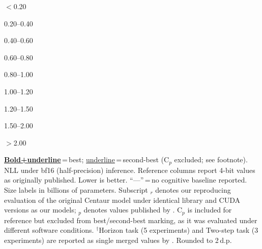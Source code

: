 \begin{table}
\begin{minipage}{\ctrtblwd}
\vspace{4pt}
\begin{center}\footnotesize
\colorbox{c1!45}{\strut\hspace{5pt}} \scriptsize$<$0.20 \quad
\colorbox{c2!40}{\strut\hspace{5pt}} \scriptsize 0.20--0.40 \quad
\colorbox{c3!40}{\strut\hspace{5pt}} \scriptsize 0.40--0.60 \quad
\colorbox{c4!45}{\strut\hspace{5pt}} \scriptsize 0.60--0.80 \quad
\colorbox{c5!55}{\strut\hspace{5pt}} \scriptsize 0.80--1.00 \quad
\colorbox{c6!50}{\strut\hspace{5pt}} \scriptsize 1.00--1.20 \quad
\colorbox{c7!45}{\strut\hspace{5pt}} \scriptsize 1.20--1.50 \quad
\colorbox{c8!40}{\strut\hspace{5pt}} \scriptsize 1.50--2.00 \quad
\colorbox{c9!35}{\strut\hspace{5pt}} \scriptsize$>$2.00
\end{center}
\vspace{-2pt}
{\tiny \underline{\textbf{Bold+underline}}\,=\,best; \underline{underline}\,=\,second-best (C$_p$ excluded; see footnote). NLL under bf16 (half-precision) inference. Reference columns report 4-bit values as originally published. Lower is better. ``---''\,=\,no cognitive baseline reported. Size labels in billions of parameters. Subscript $_r$ denotes our reproducing evaluation of the original Centaur model under identical library and CUDA versions as our models; $_p$ denotes values published by \citet{binz2025foundation}. C$_p$ is included for reference but excluded from best/second-best marking, as it was evaluated under different software conditions. $^\dagger$Horizon task (5 experiments) and Two-step task (3 experiments) are reported as single merged values by \citet{binz2025foundation}. Rounded to 2\,d.p.}
\end{minipage}
\captionsetup{width=\ctrtblwd}
\caption{\textbf{Base vs.\ finetuned NLL on Psych-101 under bf16 inference (continued).} Within each model size, the left column (base) shows the pretrained model and the right column (ft) the cognitively finetuned variant.}
\label{tab:psych101_pe_bf16_base_v_ft_cont}
\end{table}
